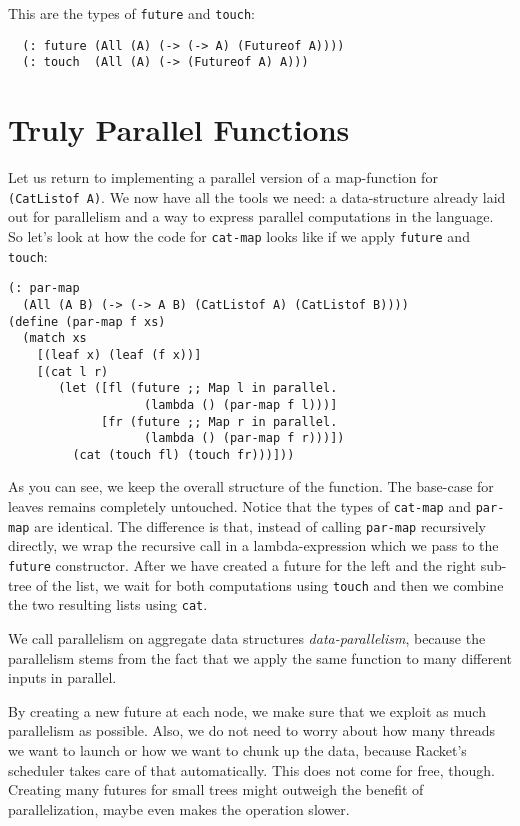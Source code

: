 \documentclass{article}
\begin{document}
This are the types of \lstinline{future} and \lstinline{touch}:

\begin{lstlisting}
  (: future (All (A) (-> (-> A) (Futureof A))))
  (: touch  (All (A) (-> (Futureof A) A)))
\end{lstlisting}

\section{Truly Parallel Functions}

Let us return to implementing a parallel version of a map-function for \lstinline{(CatListof A)}. We now have all the tools we need: a data-structure already laid out for parallelism and a way to express parallel computations in the language. So let's look at how the code for \lstinline{cat-map} looks like if we apply \lstinline{future} and \lstinline{touch}:

\begin{lstlisting}
(: par-map
  (All (A B) (-> (-> A B) (CatListof A) (CatListof B))))
(define (par-map f xs)
  (match xs
    [(leaf x) (leaf (f x))]
    [(cat l r)
       (let ([fl (future ;; Map l in parallel.
                   (lambda () (par-map f l)))]
             [fr (future ;; Map r in parallel.
                   (lambda () (par-map f r)))])
         (cat (touch fl) (touch fr)))]))
\end{lstlisting}

As you can see, we keep the overall structure of the function. The base-case for leaves remains completely untouched. Notice that the types of \lstinline{cat-map} and \lstinline{par-map} are identical. The difference is that, instead of calling \lstinline{par-map} recursively directly, we wrap the recursive call in a lambda-expression which we pass to the \lstinline{future} constructor. After we have created a future for the left and the right sub-tree of the list, we wait for both computations using \lstinline{touch} and then we combine the two resulting lists using \lstinline{cat}.

We call parallelism on aggregate data structures \emph{data-parallelism}, because the parallelism stems from the fact that we apply the same function to many different inputs in parallel.

By creating a new future at each node, we make sure that we exploit as much parallelism as possible. Also, we do not need to worry about how many threads we want to launch or how we want to chunk up the data, because Racket's scheduler takes care of that automatically. This does not come for free, though. Creating many futures for small trees might outweigh the benefit of parallelization, maybe even makes the operation slower.
\end{document}
